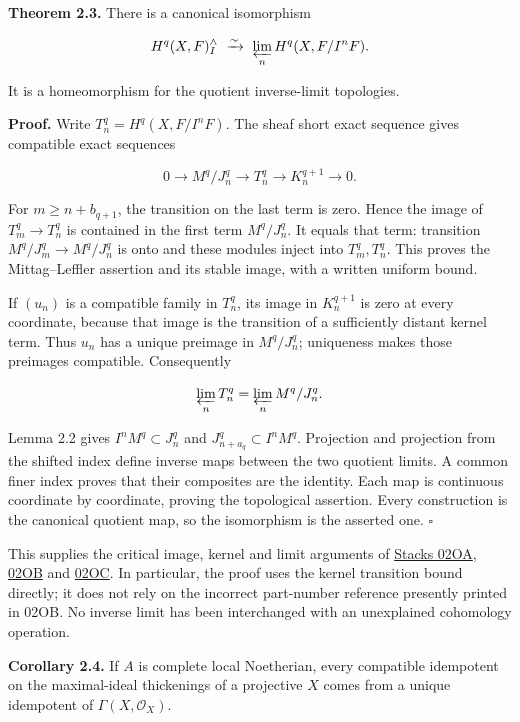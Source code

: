\documentclass[11pt,a4paper,openany]{report}
\begin{document}
\textbf{Theorem 2.3.} There is a canonical isomorphism

\[
H^q(X,F)^\wedge_I\ \xrightarrow{\sim}\
\varprojlim_nH^q(X,F/I^nF).
\]

It is a homeomorphism for the quotient inverse-limit topologies.

\textbf{Proof.} Write \(T_n^q=H^q(X,F/I^nF)\). The sheaf short exact sequence gives compatible exact sequences

\[
0\longrightarrow M^q/J_n^q\longrightarrow T_n^q
\longrightarrow K_n^{q+1}\longrightarrow0.
\]

For \(m\geq n+b_{q+1}\), the transition on the last term is zero. Hence the image of \(T_m^q\to T_n^q\) is contained in the first term \(M^q/J_n^q\). It equals that term: transition \(M^q/J_m^q\to M^q/J_n^q\) is onto and these modules inject into \(T_m^q,T_n^q\). This proves the Mittag--Leffler assertion and its stable image, with a written uniform bound.

If \((u_n)\) is a compatible family in \(T_n^q\), its image in \(K_n^{q+1}\) is zero at every coordinate, because that image is the transition of a sufficiently distant kernel term. Thus \(u_n\) has a unique preimage in \(M^q/J_n^q\); uniqueness makes those preimages compatible. Consequently

\[
\varprojlim_nT_n^q=\varprojlim_nM^q/J_n^q.
\]

Lemma 2.2 gives \(I^nM^q\subset J_n^q\) and \(J_{n+a_q}^q\subset I^nM^q\). Projection and projection from the shifted index define inverse maps between the two quotient limits. A common finer index proves that their composites are the identity. Each map is continuous coordinate by coordinate, proving the topological assertion. Every construction is the canonical quotient map, so the isomorphism is the asserted one. \(\square\)

This supplies the critical image, kernel and limit arguments of \href{https://stacks.math.columbia.edu/tag/02OA}{Stacks 02OA}, \href{https://stacks.math.columbia.edu/tag/02OB}{02OB} and \href{https://stacks.math.columbia.edu/tag/02OC}{02OC}. In particular, the proof uses the kernel transition bound directly; it does not rely on the incorrect part-number reference presently printed in 02OB. No inverse limit has been interchanged with an unexplained cohomology operation.

\textbf{Corollary 2.4.} If \(A\) is complete local Noetherian, every compatible idempotent on the maximal-ideal thickenings of a projective \(X\) comes from a unique idempotent of \(\Gamma(X,\mathcal O_X)\).
\end{document}
